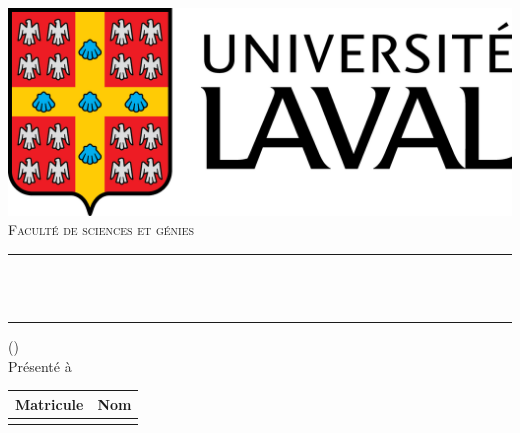 \thispagestyle{empty}
\begin{titlepage}
	\begin{center}
		\includegraphics[scale=0.2]{img/logo_ulaval.png}
		\\[0.75cm] \textsc{\normalsize Faculté de sciences et génies}\\[1.2cm]

		\vfill

		\rule{\linewidth}{0.5mm}\\[0.4cm] {\huge\bfseries \titre}\\[0.4cm] \rule{\linewidth}{0.5mm}

		\vfill

		\cours (\codeCours) \\[1cm] Présenté à \\ {\bfseries \remiseA}

		\vfill

		\begin{table}[H]
			\centering
			\begin{tabular}{|c|c|}
				\hline
				\textbf{Matricule} & \textbf{Nom}    \\
				\hline
				\text{\NI}      & \text{\auteur} \\
				\hline
			\end{tabular}
		\end{table}
	\end{center}
\end{titlepage}